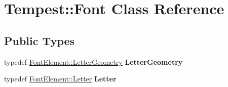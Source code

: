 \hypertarget{class_tempest_1_1_font}{\section{Tempest\+:\+:Font Class Reference}
\label{class_tempest_1_1_font}
}
\subsection*{Public Types}
\begin{DoxyCompactItemize}
\item 
\hypertarget{class_tempest_1_1_font_ab637228c56251c80f84f3439fcc46ad8}{typedef \hyperlink{struct_tempest_1_1_font_element_1_1_letter_geometry}{Font\+Element\+::\+Letter\+Geometry} {\bfseries Letter\+Geometry}}\label{class_tempest_1_1_font_ab637228c56251c80f84f3439fcc46ad8}

\item 
\hypertarget{class_tempest_1_1_font_aa5d7206380af0fbfbad2066f38dcce8d}{typedef \hyperlink{struct_tempest_1_1_font_element_1_1_letter}{Font\+Element\+::\+Letter} {\bfseries Letter}}\label{class_tempest_1_1_font_aa5d7206380af0fbfbad2066f38dcce8d}

\end{DoxyCompactItemize}
